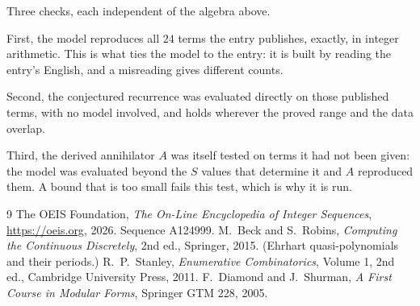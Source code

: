 \documentclass[11pt,a4paper]{article}
\theoremstyle{plain}
\theoremstyle{definition}
\begin{document}
Three checks, each independent of the algebra above.

First, the model reproduces all $24$ terms the entry publishes, exactly, in integer
arithmetic. This is what ties the model to the entry: it is built by reading the entry's
English, and a misreading gives different counts.

Second, the conjectured recurrence was evaluated directly on those published terms, with no
model involved, and holds wherever the proved range and the data overlap.

Third, the derived annihilator $A$ was itself tested on terms it had not been given: the model
was evaluated beyond the $S$ values that determine it and $A$ reproduced them. A bound that is
too small fails this test, which is why it is run.

\begin{thebibliography}{9}
 The OEIS Foundation, \emph{The On-Line Encyclopedia of Integer
Sequences}, \url{https://oeis.org}, 2026. Sequence A124999.
 M.~Beck and S.~Robins, \emph{Computing the Continuous Discretely},
2nd ed., Springer, 2015. (Ehrhart quasi-polynomials and their periods.)
 R.~P.~Stanley, \emph{Enumerative Combinatorics}, Volume 1, 2nd ed.,
Cambridge University Press, 2011.
 F.~Diamond and J.~Shurman, \emph{A First Course in Modular Forms},
Springer GTM 228, 2005.
\end{thebibliography}
\end{document}
